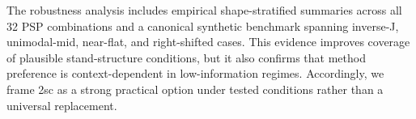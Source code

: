 The robustness analysis includes empirical shape-stratified summaries across all 32 PSP combinations and a canonical synthetic benchmark spanning inverse-J, unimodal-mid, near-flat, and right-shifted cases. This evidence improves coverage of plausible stand-structure conditions, but it also confirms that method preference is context-dependent in low-information regimes. Accordingly, we frame 2sc as a strong practical option under tested conditions rather than a universal replacement.

